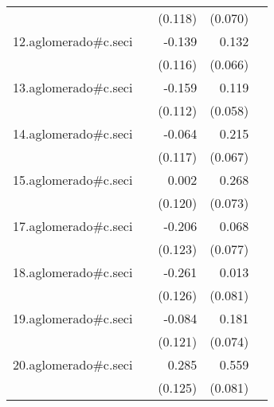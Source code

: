 {\begin{longtable}{l*{4}{D{.}{.}{-1}}}
            &                     &     (0.118)         &     (0.070)         &                     \\
\addlinespace
12.aglomerado#c.seci&                     &      -0.139         &       0.132\sym{*}  &                     \\
            &                     &     (0.116)         &     (0.066)         &                     \\
\addlinespace
13.aglomerado#c.seci&                     &      -0.159         &       0.119\sym{*}  &                     \\
            &                     &     (0.112)         &     (0.058)         &                     \\
\addlinespace
14.aglomerado#c.seci&                     &      -0.064         &       0.215\sym{**} &                     \\
            &                     &     (0.117)         &     (0.067)         &                     \\
\addlinespace
15.aglomerado#c.seci&                     &       0.002         &       0.268\sym{***}&                     \\
            &                     &     (0.120)         &     (0.073)         &                     \\
\addlinespace
17.aglomerado#c.seci&                     &      -0.206         &       0.068         &                     \\
            &                     &     (0.123)         &     (0.077)         &                     \\
\addlinespace
18.aglomerado#c.seci&                     &      -0.261\sym{*}  &       0.013         &                     \\
            &                     &     (0.126)         &     (0.081)         &                     \\
\addlinespace
19.aglomerado#c.seci&                     &      -0.084         &       0.181\sym{*}  &                     \\
            &                     &     (0.121)         &     (0.074)         &                     \\
\addlinespace
20.aglomerado#c.seci&                     &       0.285\sym{*}  &       0.559\sym{***}&                     \\
            &                     &     (0.125)         &     (0.081)         &                     \\

\end{longtable}}

